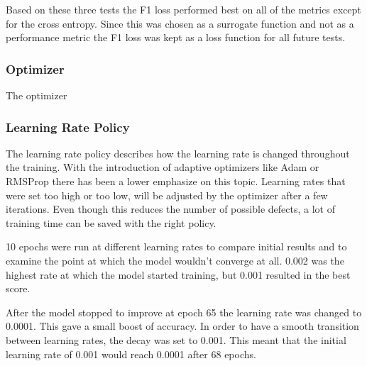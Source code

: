 Based on these three tests the F1 loss performed best on all of the metrics except for the cross entropy. Since this was chosen as a surrogate function and not as a performance metric the F1 loss was kept as a loss function for all future tests.

\iffalse

The cross entropy has a few desirable properties as a loss function, but it does not give an intuitive insight to the performance on image based results. The accuracy can also lead to misinterpretable results when there's a high imbalance between classes --- like there was in this study with different types of bones. The Fibula was visible in far fewer samples than the Femur and Tibia, while also being smaller than the other two in those images where it could be seen.

\begin{equation}
IoU = \frac{TP}{TN+TP+FP}
\end{equation}

Metrics like the DICE coefficient give a very intuitive understanding to the performance of a segmentation result. It describes the relationship between the correctly segmented area and those parts that were falsely predicted or ignored.
\fi

\subsubsection{Optimizer}

The optimizer 

\subsubsection{Learning Rate Policy}

The learning rate policy describes how the learning rate is changed throughout the training. With the introduction of adaptive optimizers like Adam or RMSProp there has been a lower emphasize on this topic. Learning rates that were set too high or too low, will be adjusted by the optimizer after a few iterations. Even though this reduces the number of possible defects, a lot of training time can be saved with the right policy.

10 epochs were run at different learning rates to compare initial results and to examine the point at which the model wouldn't converge at all. 0.002 was the highest rate at which the model started training, but 0.001 resulted in the best score.

After the model stopped to improve at epoch 65 the learning rate was changed to 0.0001. This gave a small boost of accuracy. In order to have a smooth transition between learning rates, the decay was set to 0.001. This meant that the initial learning rate of 0.001 would reach 0.0001 after 68 epochs.

